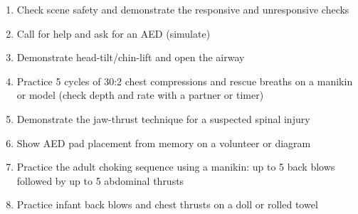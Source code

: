\begin{enumerate}[leftmargin=*]
\item Check scene safety and demonstrate the responsive and unresponsive checks
\item Call for help and ask for an AED (simulate)
\item Demonstrate head-tilt/chin-lift and open the airway
\item Practice 5 cycles of 30:2 chest compressions and rescue breaths on a manikin or model (check depth and rate with a partner or timer)
\item Demonstrate the jaw-thrust technique for a suspected spinal injury
\item Show AED pad placement from memory on a volunteer or diagram
\item Practice the adult choking sequence using a manikin: up to 5 back blows followed by up to 5 abdominal thrusts
\item Practice infant back blows and chest thrusts on a doll or rolled towel
\end{enumerate}
